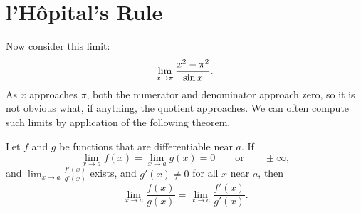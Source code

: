 \begin{exercises}


\end{exercises}











\section{l'H\^{o}pital's Rule}


Now consider this limit:
$$\lim_{x\to \pi}{x^2-\pi^2\over \sin x}.$$
As $x$ approaches $\pi$, both the numerator and denominator approach
zero, so it is not obvious what, if anything, the quotient
approaches. We can often compute such limits by application of the
following theorem.

\begin{mainTheorem} 
Let $f$ and $g$ be functions that are differentiable near $a$.  If
\[
\lim_{x \to a} f(x) = \lim_{x \to a}g(x) = 0 \qquad \text{or}\qquad \pm \infty,
\]
and $\lim_{x \to a} \frac{f'(x)}{g'(x)}$ exists, and $g'(x) \neq 0$
for all $x$ near $a$, then 
\[
\lim_{x \to a} \frac{f(x)}{g(x)} = \lim_{x \to a} \frac{f'(x)}{g'(x)}.
\]
\end{mainTheorem}


